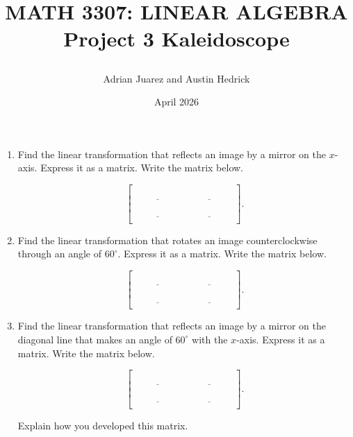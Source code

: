 \begin{enumerate}
    \item Find the linear transformation that reflects an image by a mirror on the $x$-axis.  Express it as a matrix.  Write the matrix below.

$$\left[{\begin{array}{cc}
\\
\underline{\phantom{123456789}} & \underline{\phantom{123456789}} \\
\\
\underline{\phantom{123456789}} & \underline{\phantom{123456789}} \\
\end{array}}\right].$$


\vspace{.5in}



\item Find the linear transformation that rotates an image counterclockwise through an angle of $60^{\circ}$.  Express it as a matrix.  Write the matrix below.

$$\left[{\begin{array}{cc}
\\
\underline{\phantom{123456789}} & \underline{\phantom{123456789}} \\
\\
\underline{\phantom{123456789}} & \underline{\phantom{123456789}} \\
\end{array}}\right].$$

\vspace{.5in}


\item Find the linear transformation that reflects an image by a mirror on the diagonal line that makes an angle of $60^{\circ}$ with the $x$-axis.  Express it as a matrix.  Write the matrix below.

$$\left[{\begin{array}{cc}
\\
\underline{\phantom{123456789}} & \underline{\phantom{123456789}} \\
\\
\underline{\phantom{123456789}} & \underline{\phantom{123456789}} \\
\end{array}}\right].$$

\vspace{8pt}


\noindent Explain how you developed this matrix.
\end{enumerate}
\newpage
\title{\begin{center}\huge MATH 3307: LINEAR ALGEBRA\\ 
Project 3 Kaleidoscope\end{center}}
\begin{center}
\author{\LARGE Adrian Juarez and Austin Hedrick}
\date{April 2026}\end{center}




